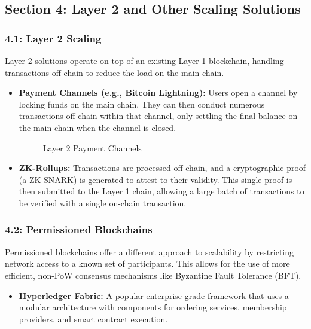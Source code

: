 \subsection{Section 4: Layer 2 and Other Scaling
Solutions}\label{section-4-layer-2-and-other-scaling-solutions}

\subsubsection{4.1: Layer 2 Scaling}\label{layer-2-scaling}

Layer 2 solutions operate on top of an existing Layer 1 blockchain,
handling transactions off-chain to reduce the load on the main chain.

\begin{itemize}
\item
  \textbf{Payment Channels (e.g., Bitcoin Lightning):} Users open a
  channel by locking funds on the main chain. They can then conduct
  numerous transactions off-chain within that channel, only settling the
  final balance on the main chain when the channel is closed.

  \begin{figure}
  \centering
  \caption{Layer 2 Payment Channels}
  \end{figure}
\item
  \textbf{ZK-Rollups:} Transactions are processed off-chain, and a
  cryptographic proof (a ZK-SNARK) is generated to attest to their
  validity. This single proof is then submitted to the Layer 1 chain,
  allowing a large batch of transactions to be verified with a single
  on-chain transaction.
\end{itemize}

\subsubsection{4.2: Permissioned
Blockchains}\label{permissioned-blockchains}

Permissioned blockchains offer a different approach to scalability by
restricting network access to a known set of participants. This allows
for the use of more efficient, non-PoW consensus mechanisms like
Byzantine Fault Tolerance (BFT).

\begin{itemize}
\tightlist
\item
  \textbf{Hyperledger Fabric:} A popular enterprise-grade framework that
  uses a modular architecture with components for ordering services,
  membership providers, and smart contract execution.
\end{itemize}

